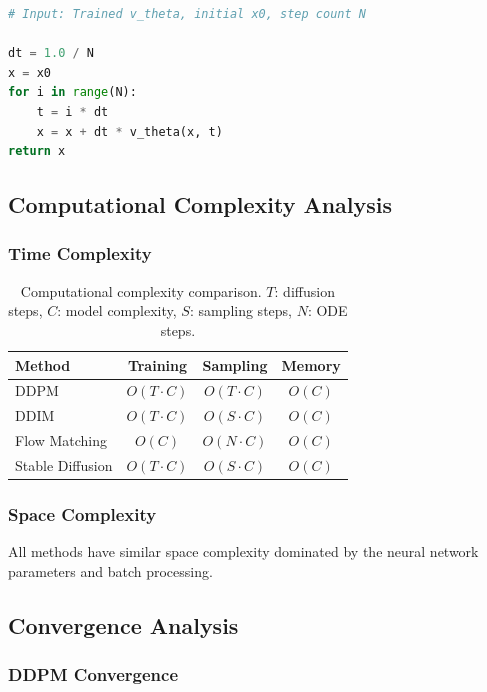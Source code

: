 \documentclass[a4paper,12pt]{article}
\begin{document}
\begin{lstlisting}[language=Python, caption=ODE Sampling Algorithm]
# Input: Trained v_theta, initial x0, step count N

dt = 1.0 / N
x = x0
for i in range(N):
    t = i * dt
    x = x + dt * v_theta(x, t)
return x
\end{lstlisting}

\subsection{Computational Complexity Analysis}

\subsubsection{Time Complexity}

\begin{table}[H]
    \centering
    \begin{tabular}{lccc}
        \toprule
        \textbf{Method} & \textbf{Training} & \textbf{Sampling} & \textbf{Memory} \\
        \midrule
        DDPM & $O(T \cdot C)$ & $O(T \cdot C)$ & $O(C)$ \\
        DDIM & $O(T \cdot C)$ & $O(S \cdot C)$ & $O(C)$ \\
        Flow Matching & $O(C)$ & $O(N \cdot C)$ & $O(C)$ \\
        Stable Diffusion & $O(T \cdot C)$ & $O(S \cdot C)$ & $O(C)$ \\
        \bottomrule
    \end{tabular}
    \caption{Computational complexity comparison. $T$: diffusion steps, $C$: model complexity, $S$: sampling steps, $N$: ODE steps.}
    \label{tab:complexity}
\end{table}

\subsubsection{Space Complexity}

All methods have similar space complexity dominated by the neural network parameters and batch processing.

\subsection{Convergence Analysis}

\subsubsection{DDPM Convergence}
\end{document}
